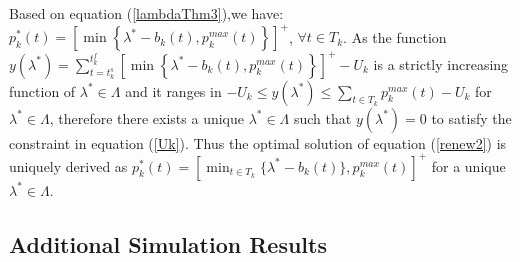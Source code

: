 \documentclass[12pt,draftcls,onecolumn]{IEEEtran}
\begin{document}
\indent Based on equation (\ref{lambdaThm3}),we have: $p_k^{*}(t)=[\min\left\{\lambda^*-b_k(t), p_k^{max}(t)\right\}]^{+}$, $\forall t \in T_k$. As the function $y(\lambda^*) = \sum_{t=t_k^s}^{t_k^f} [\min\left\{\lambda^*-b_k(t), p_k^{max}(t)\right\}]^{+}-U_k$ is a strictly increasing function of $\lambda^* \in \Lambda$ and it ranges in $-U_k \leq y(\lambda^*) \leq \sum_{t \in T_k}p_k^{max}(t)-U_k$ for $\lambda^* \in \Lambda$, therefore there exists a unique $\lambda^* \in \Lambda$ such that $y(\lambda^*)=0$ to satisfy the constraint in equation (\ref{Uk}). Thus the optimal solution of equation (\ref{renew2}) is uniquely derived as $p_k^{*}(t)=[\min_{t \in T_k}\{\lambda^{*}-b_k(t)\}, p_k^{max}(t)]^{+}$ for a unique $\lambda^{*} \in \Lambda$.\\
\subsection{Additional Simulation Results}
\end{document}
